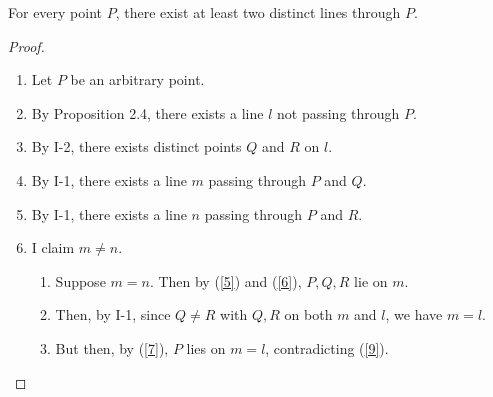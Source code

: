 \documentclass{article}
\begin{document}
 For every point $P$, there exist at least two distinct lines through $P$.
\begin{proof}

\begin{enumerate}
\item Let $P$ be an arbitrary point. 
\item \label{9} By Proposition 2.4, there exists a line $l$ not passing through $P$.
\item By I-2, there exists distinct points $Q$ and $R$ on $l$.
\item \label{5} By I-1, there exists a line $m$ passing through $P$ and $Q$.
\item \label{6} By I-1, there exists a line $n$ passing through $P$ and $R$.
\item I claim $m \ne n$.
\begin{enumerate}
\item \label{7} Suppose $m = n$. Then by (\ref{5}) and (\ref{6}), $P, Q, R$ lie on $m$.
\item Then, by I-1, since $Q \ne R$ with $Q,R$ on both $m$ and $l$, we have $m = l$.
\item But then, by (\ref{7}), $P$ lies on $m = l$, contradicting (\ref{9}).
\end{enumerate}
\end{enumerate}
\end{proof}
\end{document}
